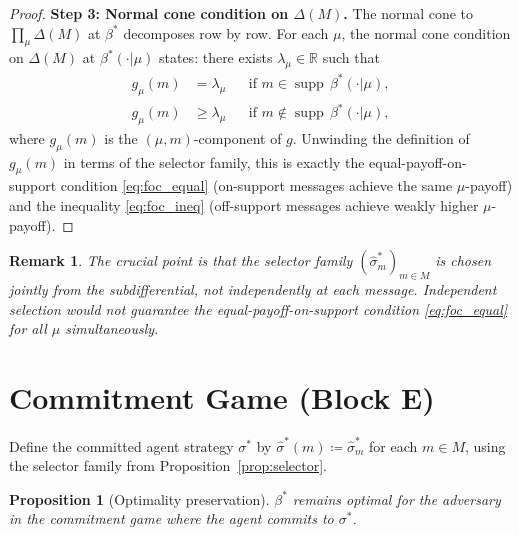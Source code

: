 \documentclass[12pt]{article}
\newtheorem{proposition}[theorem]{Proposition}
\newtheorem{remark}[theorem]{Remark}
\newcommand{\R}{\mathbb{R}}
\newcommand{\supp}{\operatorname{supp}}
\begin{document}
\begin{proof}
\medskip\noindent
\textbf{Step 3: Normal cone condition on $\Delta(M)$.}
The normal cone to $\prod_\mu \Delta(M)$ at $\beta^*$ decomposes row by row. For each $\mu$, the normal cone condition on $\Delta(M)$ at $\beta^*(\cdot|\mu)$ states: there exists $\lambda_\mu \in \R$ such that
\begin{align*}
g_\mu(m) &= \lambda_\mu && \text{if } m \in \supp\,\beta^*(\cdot|\mu), \\
g_\mu(m) &\geq \lambda_\mu && \text{if } m \notin \supp\,\beta^*(\cdot|\mu),
\end{align*}
where $g_\mu(m)$ is the $(\mu,m)$-component of $g$. Unwinding the definition of $g_\mu(m)$ in terms of the selector family, this is exactly the equal-payoff-on-support condition \eqref{eq:foc_equal} (on-support messages achieve the same $\mu$-payoff) and the inequality \eqref{eq:foc_ineq} (off-support messages achieve weakly higher $\mu$-payoff).
\end{proof}

\begin{remark}
The crucial point is that the selector family $(\hat\sigma^*_m)_{m \in M}$ is chosen \emph{jointly} from the subdifferential, not independently at each message. Independent selection would not guarantee the equal-payoff-on-support condition \eqref{eq:foc_equal} for all $\mu$ simultaneously.
\end{remark}

\section{Commitment Game (Block E)}
\label{sec:commitment}

Define the committed agent strategy $\sigma^*$ by $\hat\sigma^*(m) \coloneqq \hat\sigma^*_m$ for each $m \in M$, using the selector family from Proposition~\ref{prop:selector}.

\begin{proposition}[Optimality preservation]
\label{prop:commitment}
$\beta^*$ remains optimal for the adversary in the commitment game where the agent commits to $\sigma^*$.
\end{proposition}
\end{document}
